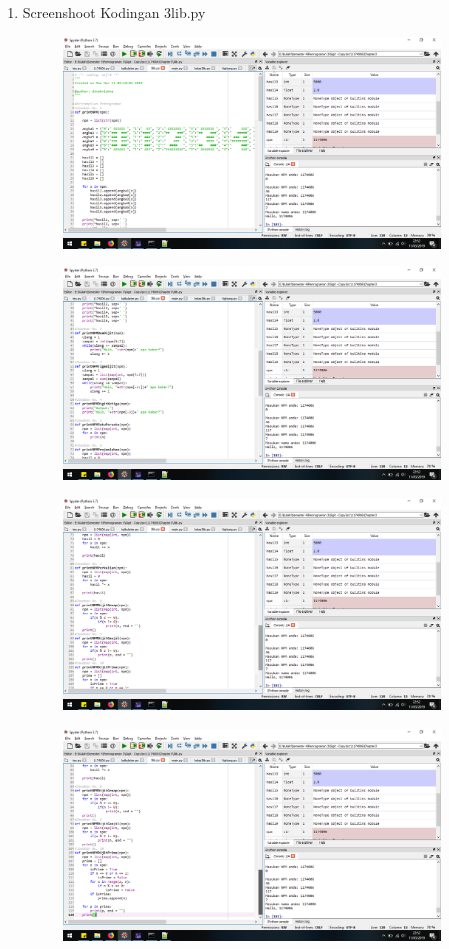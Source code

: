 \begin{enumerate}
\item Screenshoot Kodingan 3lib.py
\begin{figure}[H]
	\includegraphics[width=10cm]{figures/diva/Chapter3/3lib_1.png}
	\centering
\end{figure}
\begin{figure}[H]
	\includegraphics[width=10cm]{figures/diva/Chapter3/3lib_2.png}
	\centering
\end{figure}
\begin{figure}[H]
	\includegraphics[width=10cm]{figures/diva/Chapter3/3lib_3.png}
	\centering
\end{figure}
\begin{figure}[H]
	\includegraphics[width=10cm]{figures/diva/Chapter3/3lib_4.png}
	\centering
\end{figure}


\end{enumerate}
